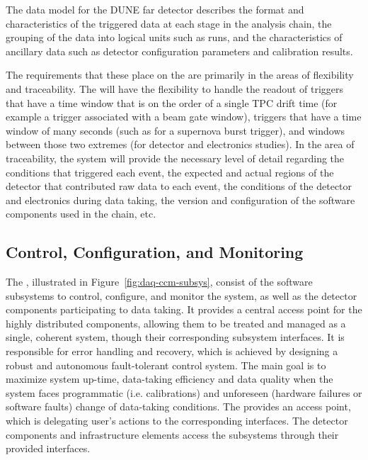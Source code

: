 The data model for the DUNE far detector describes the format and characteristics of the triggered data at each stage in the analysis chain, the grouping of the data into logical units such as runs, and the characteristics of ancillary data such as detector configuration parameters and calibration results.

The requirements that these place on the  are primarily in the areas of flexibility and traceability.  The  will have the flexibility to handle the readout of triggers that have a time window that is on the order of a single TPC drift time (for example a trigger associated with a beam gate window), triggers that have a time window of many seconds (such as for a supernova burst trigger), and windows between those two extremes (for detector and electronics studies).  In the area of traceability, the  system will provide the necessary level of detail regarding the conditions that triggered each event, the expected and actual regions of the detector that contributed raw data to each event, the conditions of the detector and electronics during data taking, the version and configuration of the software components used in the  chain, etc.

\subsection{Control, Configuration, and Monitoring}
\label{sec:daq:design-run-control}

The , illustrated in Figure~\ref{fig:daq-ccm-subsys}, consist of the software
subsystems to control, configure, and monitor the  system, as well as the detector components
participating to data taking. It provides a central access point for the highly distributed 
components, allowing them to be treated and managed as a single, coherent system, though their
corresponding subsystem interfaces. It is responsible for error handling and recovery, which is
achieved by designing a robust and autonomous fault-tolerant control system. The main goal is to
maximize system up-time, data-taking efficiency and data quality when the system faces programmatic
(i.e. calibrations) and unforeseen (hardware failures or software faults) change of data-taking
conditions. The  provides an access point, which is delegating user's actions to the
corresponding interfaces. The detector components and infrastructure elements access the 
subsystems through their provided interfaces. 

